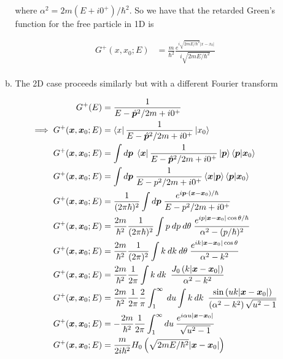 \documentclass[]{article}
\begin{document}
\begin{enumerate}[1)]
\begin{enumerate}[a)]
where $ \alpha^2 = 2m\left( E + i0^+ \right)/\hbar^2$. So we have that the retarded Green's function for the free particle in 1D is

\begin{equation}
\begin{split}
G^+(x,x_0 ; E) & = \frac{m}{\hbar^2}  \frac{ e^{i \sqrt{2mE/\hbar^2}  |x - x_0|}  }{i  \sqrt{2mE/\hbar^2}} \\
\end{split}
\end{equation}

\item The 2D case proceeds similarly but with a different Fourier transform

\begin{equation}
\begin{split}
G^+(E) & = \frac{1}{E -  \hat{\bm{p}}^2/2m + i0^+} \\
\implies G^+(\bm{x},\bm{x}_0 ; E) & = \bra{x}  \frac{1}{E -  \hat{\bm{p}}^2/2m + i0^+} \ket{x_0} \\
G^+(\bm{x},\bm{x}_0 ; E) & = \int d\bm{p} \;\bra{\bm{x}}  \frac{1}{E -  \hat{\bm{p}}^2/2m + i0^+} \ket{\bm{p}}\braket{\bm{p}}{\bm{x}_0} \\
G^+(\bm{x},\bm{x}_0 ; E) & = \int d\bm{p}  \;  \frac{1}{E -  p^2/2m + i0^+} \braket{\bm{x}}{\bm{p}}  \braket{\bm{p}}{\bm{x}_0} \\
G^+(\bm{x},\bm{x}_0 ; E) & = \frac{1}{( 2\pi \hbar)^2} \int d\bm{p}  \;  \frac{  e^{i \bm{p} \cdot (\bm{x} - \bm{x}_0 )/ \hbar}    }{E -  p^2/2m + i0^+}  \\
G^+(\bm{x},\bm{x}_0 ; E) & =  \frac{2m}{\hbar^2}  \frac{1}{( 2\pi \hbar)^2} \int p \: dp \: d\theta  \;  \frac{  e^{i p  |\bm{x} - \bm{x}_0 | \cos\theta / \hbar }    }{\alpha^2 -  (p/\hbar)^2}  \\
G^+(\bm{x},\bm{x}_0 ; E) & =  \frac{2m}{\hbar^2}  \frac{1}{( 2\pi )^2} \int k \: dk \: d\theta  \;  \frac{  e^{i k  |\bm{x} - \bm{x}_0 | \cos\theta}    }{\alpha^2 -  k^2}  \\
G^+(\bm{x},\bm{x}_0 ; E) & =  \frac{2m}{\hbar^2}  \frac{1}{2\pi } \int k \: dk \:  \;  \frac{ J_0 \left(k |\bm{x} - \bm{x}_0 | \right)   }{\alpha^2 -  k^2}  \\
G^+(\bm{x},\bm{x}_0 ; E) & =  \frac{2m}{\hbar^2}  \frac{1}{2\pi } \frac{2}{\pi} \int_{1}^{\infty} \: du \int k \: dk \: \;  \frac{ \sin\left(u k |\bm{x} - \bm{x}_0 | \right)   }{ \left(   \alpha^2 -  k^2 \right)  \sqrt{ u^2 -1 }}  \\
G^+(\bm{x},\bm{x}_0 ; E) & =  -  \frac{2m}{\hbar^2}  \frac{1}{2\pi } \int_{1}^{\infty} du \: \frac{ e^{i  \alpha u |\bm{x} - \bm{x}_0 |  }    }{\sqrt{ u^2 -1 }  }  \\
G^+(\bm{x},\bm{x}_0 ; E) & =    \frac{m}{2 i \hbar^2} H_0\left(   \sqrt{2mE/\hbar^2}   |\bm{x} - \bm{x}_0 | \right) \\
\end{split}
\end{equation}



\end{enumerate}
\end{enumerate}
\end{document}
